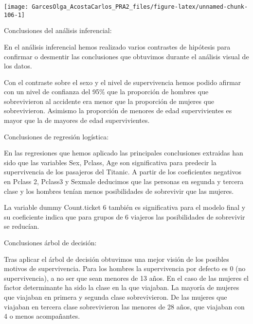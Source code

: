 \documentclass[
]{article}
\newenvironment{Shaded}{\begin{snugshade}}{\end{snugshade}}
\newcommand{\DataTypeTok}[1]{\textcolor[rgb]{0.13,0.29,0.53}{#1}}
\newcommand{\KeywordTok}[1]{\textcolor[rgb]{0.13,0.29,0.53}{\textbf{#1}}}
\newcommand{\NormalTok}[1]{#1}
\newcommand{\OperatorTok}[1]{\textcolor[rgb]{0.81,0.36,0.00}{\textbf{#1}}}
\newcommand{\StringTok}[1]{\textcolor[rgb]{0.31,0.60,0.02}{#1}}
\begin{document}
\begin{Shaded}
\end{Shaded}

\begin{center}\texttt{[image: GarcesOlga\_AcostaCarlos\_PRA2\_files/figure-latex/unnamed-chunk-106-1]} \end{center}

Conclusiones del análisis inferencial:

En el análisis inferencial hemos realizado varios contrastes de
hipótesis para confirmar o desmentir las conclusiones que obtuvimos
durante el análisis visual de los datos.

Con el contraste sobre el sexo y el nivel de supervivencia hemos podido
afirmar con un nivel de confianza del 95\% que la proporción de hombres
que sobrevivieron al accidente era menor que la proporción de mujeres
que sobrevivieron. Asimismo la proporción de menores de edad
supervivientes es mayor que la de mayores de edad supervivientes.

Conclusiones de regresión logística:

En las regresiones que hemos aplicado las principales conclusiones
extraidas han sido que las variables Sex, Pclass, Age son significativa
para predecir la supervivencia de los pasajeros del Titanic. A partir de
los coeficientes negativos en Pclass 2, Pclass3 y Sexmale deducimos que
las personas en segunda y tercera clase y los hombres tenían menos
posibilidades de sobrevivir que las mujeres.

La variable dummy Count.ticket 6 también es significativa para el modelo
final y su coeficiente indica que para grupos de 6 viajeros las
posibilidades de sobrevivir se reducían.

Conclusiones árbol de decisión:

Tras aplicar el árbol de decisión obtuvimos una mejor visión de los
posibles motivos de supervivencia. Para los hombres la supervivencia por
defecto es 0 (no supervivencia), a no ser que sean menores de 13 años.
En el caso de las mujeres el factor determinante ha sido la clase en la
que viajaban. La mayoría de mujeres que viajaban en primera y segunda
clase sobrevivieron. De las mujeres que viajaban en tercera clase
sobrevivieron las menores de 28 años, que viajaban con 4 o menos
acompañantes.
\end{document}
